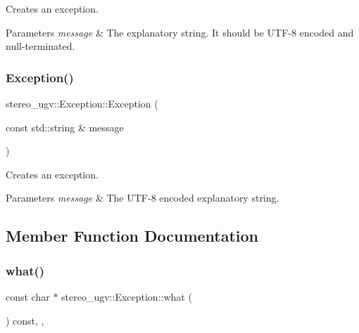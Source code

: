 Creates an exception. 


\begin{DoxyParams}{Parameters}
{\em message} & The explanatory string. It should be U\+T\+F-\/8 encoded and null-\/terminated. \\
\hline
\end{DoxyParams}
\mbox{\label{classstereo__ugv_1_1Exception_a8d813f3fb347af4b3682c2a4bc22d59b}} 
\subsubsection{\texorpdfstring{Exception()}{Exception()}\hspace{0.1cm}{\footnotesize\ttfamily [2/2]}}
{\footnotesize\ttfamily stereo\+\_\+ugv\+::\+Exception\+::\+Exception (\begin{DoxyParamCaption}\item[{const std\+::string \&}]{message }\end{DoxyParamCaption})}



Creates an exception. 


\begin{DoxyParams}{Parameters}
{\em message} & The U\+T\+F-\/8 encoded explanatory string. \\
\hline
\end{DoxyParams}


\subsection{Member Function Documentation}
\mbox{\label{classstereo__ugv_1_1Exception_a6222ba0a0cd622e7b560f8dcadf2ec87}} 
\subsubsection{\texorpdfstring{what()}{what()}}
{\footnotesize\ttfamily const char $\ast$ stereo\+\_\+ugv\+::\+Exception\+::what (\begin{DoxyParamCaption}{ }\end{DoxyParamCaption}) const\hspace{0.3cm}{\ttfamily [override]}, {\ttfamily [virtual]}, {\ttfamily [noexcept]}}



